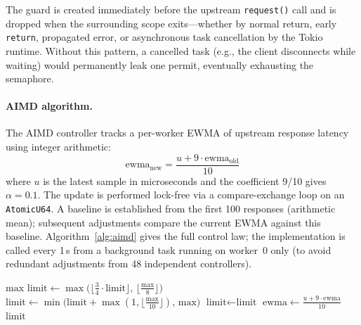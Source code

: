 \documentclass[a4paper, 11pt]{article}
\begin{document}
The guard is created immediately before the upstream \texttt{request()} call and
is dropped when the surrounding scope exits---whether by normal return, early
\texttt{return}, propagated error, or asynchronous task cancellation by the
Tokio runtime.  Without this pattern, a cancelled task (e.g., the client
disconnects while waiting) would permanently leak one permit, eventually
exhausting the semaphore.

\paragraph{AIMD algorithm.}  The AIMD controller tracks a per-worker EWMA of
upstream response latency using integer arithmetic:
\[
  \text{ewma}_{\text{new}} = \frac{u + 9 \cdot \text{ewma}_{\text{old}}}{10}
\]
where $u$ is the latest sample in microseconds and the coefficient 9/10 gives
$\alpha = 0.1$.  The update is performed lock-free via a compare-exchange loop
on an \texttt{AtomicU64}.  A baseline is established from the first 100 responses
(arithmetic mean); subsequent adjustments compare the current EWMA against this
baseline.  Algorithm~\ref{alg:aimd} gives the full control law; the
implementation is called every 1\,s from a background task running on worker~0
only (to avoid redundant adjustments from 48 independent controllers).

\begin{algorithm}[t]
\caption{AIMD concurrency adjustment (called every 1\,s).}
\label{alg:aimd}
\begin{algorithmic}[1]
   
    \State \Return $\text{max}$
  \EndIf
   
    \State $\text{limit} \gets \max\!\bigl(\lfloor\tfrac{3}{4} \cdot \text{limit}\rfloor,\,
                                           \lfloor\tfrac{\text{max}}{8}\rfloor\bigr)$
   
    \State $\text{limit} \gets \min\!\bigl(\text{limit} + \max(1, \lfloor\tfrac{\text{max}}{10}\rfloor),\,
                                           \text{max}\bigr)$
  \Else {}
    \State $\text{limit} \gets \text{limit}$
  \EndIf
  \State $\text{ewma} \gets \tfrac{u + 9 \cdot \text{ewma}}{10}$
  \State \Return $\text{limit}$
\EndFunction
\end{algorithmic}
\end{algorithm}
\end{document}
